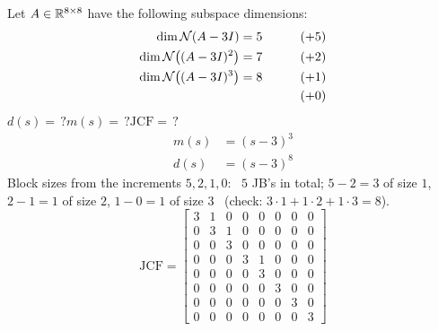 \begin{example}
Let $A\in\mathbb{R}^{8\times8}$ have the following subspace dimensions:
\begin{alignat*}{2}
\dim\mathcal{N}(A-3I)&=5 &\qquad& (+5)\\
\dim\mathcal{N}\big((A-3I)^2\big)&=7 && (+2)\\
\dim\mathcal{N}\big((A-3I)^3\big)&=8 && (+1)\\
& && (+0)
\end{alignat*}
$d(s)=\,?$\quad $m(s)=\,?$\quad $\text{JCF}=\,?$
\begin{align*}
m(s)&=(s-3)^3\\
d(s)&=(s-3)^8
\end{align*}
Block sizes from the increments $5,2,1,0$: \ $5$ JB's in total; $5-2=3$ of size $1$, $2-1=1$ of size $2$, $1-0=1$ of size $3$ \ (check: $3\cdot1+1\cdot2+1\cdot3=8$).
\[
\text{JCF}=\left[\begin{array}{ccc|cc|c|c|c}
3&1&0&0&0&0&0&0\\
0&3&1&0&0&0&0&0\\
0&0&3&0&0&0&0&0\\\hline
0&0&0&3&1&0&0&0\\
0&0&0&0&3&0&0&0\\\hline
0&0&0&0&0&3&0&0\\\hline
0&0&0&0&0&0&3&0\\\hline
0&0&0&0&0&0&0&3
\end{array}\right]
\]
\end{example}

